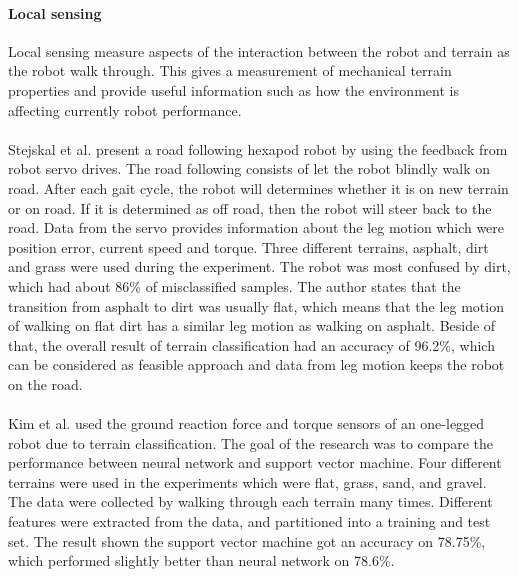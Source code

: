 \documentclass[USenglish]{ifimaster}  %
\begin{document}
\paragraph{Local sensing}
Local sensing measure aspects of the interaction between the robot and terrain as the robot walk through. This gives a measurement of mechanical terrain properties and provide useful information such as how the environment is affecting currently robot performance. 
\\
\\ 
Stejskal et al. \cite{7487544} present a road following hexapod robot by using the feedback from robot servo drives. The road following consists of let the robot blindly walk on road. After each gait cycle, the robot will determines whether it is on new terrain or on road. If it is determined as off road, then the robot will steer back to the road. Data from the servo provides information about the leg motion which were position error, current speed and torque. Three different terrains, asphalt, dirt and grass were used during the experiment. The robot was most confused by dirt, which had about 86\% of misclassified samples. The author states that the transition from asphalt to dirt was usually flat, which means that the leg motion of walking on flat dirt has a similar leg motion as walking on asphalt. Beside of that, the overall result of terrain classification had an accuracy of 96.2\%, which can be considered as feasible approach and data from leg motion keeps the robot on the road.
\\
\\
Kim et al. \cite{5602459} used the ground reaction force and torque sensors of an one-legged robot due to terrain classification. The goal of the research was to compare the performance between neural network and support vector machine. Four different terrains were used in the experiments which were flat, grass, sand, and gravel. The data were collected by walking through each terrain many times. Different features were extracted from the data, and partitioned into a training and test set. The result shown the support vector machine got an accuracy on 78.75\%, which performed slightly better than neural network on 78.6\%.
\\
\\
\end{document}
